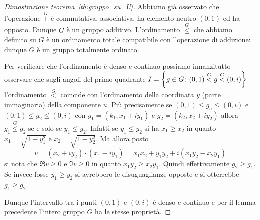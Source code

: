 \begin{proof}[Dimostrazione teorema~\ref{th:gruppo_su_U}]
Abbiamo già osservato che l'operazione $\stackrel G+$ 
è commutativa, associativa, ha elemento neutro $(0,1)$ 
ed ha opposto. 
Dunque $G$ è un gruppo additivo.
L'ordinamento $\stackrel G\le$ che abbiamo definito su 
$G$ è un ordinamento totale compatibile con l'operazione 
di addizione: dunque $G$ è un gruppo totalmente ordinato.

Per verificare che l'ordinamento è denso e continuo 
possiamo innanzitutto osservare che sugli angoli 
del primo quadrante 
$I={\left\{ g\in G\colon (0,1)\stackrel G< g \stackrel G< (0,i) \right\}}$
l'ordinamento $\stackrel G <$
coincide con l'ordinamento della coordinata $y$ (parte 
immaginaria) della componente $u$. 
Più precisamente se $(0,1)\le g_a\le (0,i)$ e $(0,1)\le g_2\le (0,i)$
con $g_1 = (k_1,x_1+iy_1)$ e $g_2=(k_2,x_2+iy_2)$ 
allora $g_1\stackrel G\le g_2$ se e solo se $y_1\le y_2$.
Infatti se $y_1\le y_2$ si ha $x_1 \ge x_2$ in quanto 
$x_1 = \sqrt{1-y_1^2}$ e $x_2= \sqrt{1-y_2^2}$.
Ma allora posto
\[
  v = (x_2+iy_2)\cdot(x_1-iy_1) = x_1x_2+y_1y_2 
  +i(x_1 y_2-x_2y_1)
\]
si nota che $\Re v\ge0$ e $\Im v\ge 0$ in quanto 
$x_1y_2 \ge x_2y_1$. Quindi effettivamente $g_2\ge g_1$.
Se invece fosse $y_1 \ge y_2$ si avrebbero le disuguaglianze 
opposte e si otterrebbe $g_1\ge g_2$.

Dunque l'intervallo tra i punti $(0,1)$ e $(0,i)$ 
è denso e continuo e per il lemma precedente l'intero 
gruppo $G$ ha le stesse proprietà.
\end{proof}


